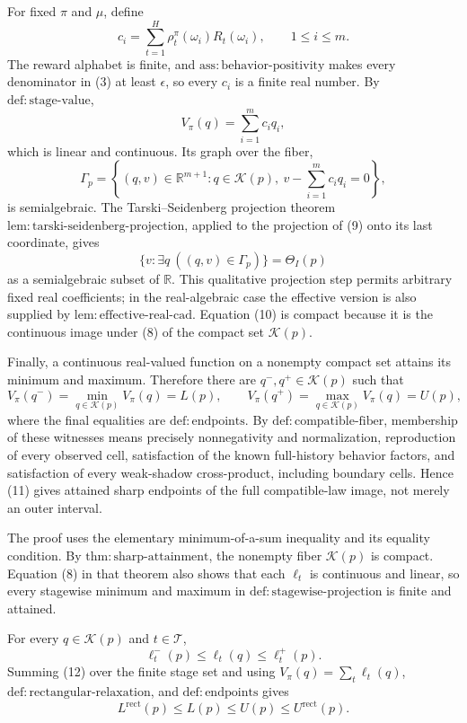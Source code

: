 For fixed \(\pi\) and \(\mu\), define
\[
 c_i=\sum_{t=1}^H\rho_t^\pi(\omega_i)R_t(\omega_i),
 \qquad 1\leq i\leq m.
\tag{7}
\]
The reward alphabet is finite, and \(\mathrm{ass{:}behavior\text{-}positivity}\) makes every denominator in (3) at least \(\epsilon\), so every \(c_i\) is a finite real number.  By \(\mathrm{def{:}stage\text{-}value}\),
\[
 V_\pi(q)=\sum_{i=1}^m c_iq_i,
\tag{8}
\]
which is linear and continuous.  Its graph over the fiber,
\[
 \Gamma_p=\left\{(q,v)\in\mathbb R^{m+1}:q\in\mathcal K(p),\ v-\sum_{i=1}^m c_iq_i=0\right\},
\tag{9}
\]
is semialgebraic.  The Tarski--Seidenberg projection theorem \(\mathrm{lem{:}tarski\text{-}seidenberg\text{-}projection}\), applied to the projection of (9) onto its last coordinate, gives
\[
 \{v:\exists q\ ((q,v)\in\Gamma_p)\}=\Theta_I(p)
\tag{10}
\]
as a semialgebraic subset of \(\mathbb R\).  This qualitative projection step permits arbitrary fixed real coefficients; in the real-algebraic case the effective version is also supplied by \(\mathrm{lem{:}effective\text{-}real\text{-}cad}\).  Equation (10) is compact because it is the continuous image under (8) of the compact set \(\mathcal K(p)\).

Finally, a continuous real-valued function on a nonempty compact set attains its minimum and maximum.  Therefore there are \(q^-,q^+\in\mathcal K(p)\) such that
\[
 V_\pi(q^-)=\min_{q\in\mathcal K(p)}V_\pi(q)=L(p),
 \qquad
 V_\pi(q^+)=\max_{q\in\mathcal K(p)}V_\pi(q)=U(p),
\tag{11}
\]
where the final equalities are \(\mathrm{def{:}endpoints}\).  By \(\mathrm{def{:}compatible\text{-}fiber}\), membership of these witnesses means precisely nonnegativity and normalization, reproduction of every observed cell, satisfaction of the known full-history behavior factors, and satisfaction of every weak-shadow cross-product, including boundary cells.  Hence (11) gives attained sharp endpoints of the full compatible-law image, not merely an outer interval.

The proof uses the elementary minimum-of-a-sum inequality and its equality condition.  By \(\mathrm{thm{:}sharp\text{-}attainment}\), the nonempty fiber \(\mathcal K(p)\) is compact.  Equation (8) in that theorem also shows that each \(\ell_t\) is continuous and linear, so every stagewise minimum and maximum in \(\mathrm{def{:}stagewise\text{-}projection}\) is finite and attained.

For every \(q\in\mathcal K(p)\) and \(t\in\mathcal T\),
\[
 \ell_t^-(p)\leq \ell_t(q)\leq \ell_t^+(p).
\tag{12}
\]
Summing (12) over the finite stage set and using \(V_\pi(q)=\sum_t\ell_t(q)\), \(\mathrm{def{:}rectangular\text{-}relaxation}\), and \(\mathrm{def{:}endpoints}\) gives
\[
 L^{\mathrm{rect}}(p)\leq L(p)\leq U(p)\leq U^{\mathrm{rect}}(p).
\tag{13}
\]

